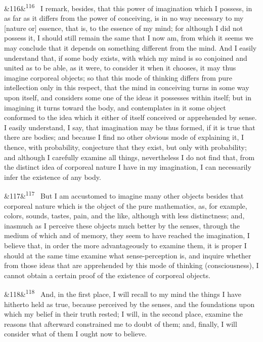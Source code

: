 \documentclass[12pt]{article}
\newcommand{\para}[1][]{\par\noindent\ifx&#1&\else\textsuperscript{\footnotesize #1}~\fi}
\begin{document}
\para[116] I remark, besides, that this power of imagination which I possess, in as far as it differs from the power of conceiving, is in no way necessary to my [nature or] essence, that is, to the essence of my mind; for although I did not possess it, I should still remain the same that I now am, from which it seems we may conclude that it depends on something different from the mind. And I easily understand that, if some body exists, with which my mind is so conjoined and united as to be able, as it were, to consider it when it chooses, it may thus imagine corporeal objects; so that this mode of thinking differs from pure intellection only in this respect, that the mind in conceiving turns in some way upon itself, and considers some one of the ideas it possesses within itself; but in imagining it turns toward the body, and contemplates in it some object conformed to the idea which it either of itself conceived or apprehended by sense. I easily understand, I say, that imagination may be thus formed, if it is true that there are bodies; and because I find no other obvious mode of explaining it, I thence, with probability, conjecture that they exist, but only with probability; and although I carefully examine all things, nevertheless I do not find that, from the distinct idea of corporeal nature I have in my imagination, I can necessarily infer the existence of any body.

\para[117] But I am accustomed to imagine many other objects besides that corporeal nature which is the object of the pure mathematics, as, for example, colors, sounds, tastes, pain, and the like, although with less distinctness; and, inasmuch as I perceive these objects much better by the senses, through the medium of which and of memory, they seem to have reached the imagination, I believe that, in order the more advantageously to examine them, it is proper I should at the same time examine what sense-perception is, and inquire whether from those ideas that are apprehended by this mode of thinking (consciousness), I cannot obtain a certain proof of the existence of corporeal objects.

\para[118] And, in the first place, I will recall to my mind the things I have hitherto held as true, because perceived by the senses, and the foundations upon which my belief in their truth rested; I will, in the second place, examine the reasons that afterward constrained me to doubt of them; and, finally, I will consider what of them I ought now to believe.
\end{document}
